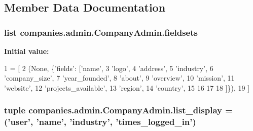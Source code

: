 \subsection{Member Data Documentation}
\hypertarget{classcompanies_1_1admin_1_1_company_admin_a2d93c6598f4c7641fe11eb1d94e67735}{
\subsubsection[{fieldsets}]{\setlength{\rightskip}{0pt plus 5cm}list companies.\-admin.\-Company\-Admin.\-fieldsets\hspace{0.3cm}{\ttfamily [static]}}}\label{classcompanies_1_1admin_1_1_company_admin_a2d93c6598f4c7641fe11eb1d94e67735}
{\bfseries Initial value\-:}
\begin{DoxyCode}
1 = [
2         (\textcolor{keywordtype}{None}, \{\textcolor{stringliteral}{'fields'}: [\textcolor{stringliteral}{'name'},
3                            \textcolor{stringliteral}{'logo'},
4                            \textcolor{stringliteral}{'address'},
5                            \textcolor{stringliteral}{'industry'},
6                            \textcolor{stringliteral}{'company\_size'},
7                            \textcolor{stringliteral}{'year\_founded'},
8                            \textcolor{stringliteral}{'about'},
9                            \textcolor{stringliteral}{'overview'},
10                            \textcolor{stringliteral}{'mission'},
11                            \textcolor{stringliteral}{'website'},
12                            \textcolor{stringliteral}{'projects\_available'},
13                            \textcolor{stringliteral}{'region'},
14                            \textcolor{stringliteral}{'country'},
15 
16 
17 
18         ]\}),
19     ]
\end{DoxyCode}
\hypertarget{classcompanies_1_1admin_1_1_company_admin_abb4744d6d299e31f3dd04cf568f99316}{
\subsubsection[{list\-\_\-display}]{\setlength{\rightskip}{0pt plus 5cm}tuple companies.\-admin.\-Company\-Admin.\-list\-\_\-display = ('user', 'name', 'industry', 'times\-\_\-logged\-\_\-in')\hspace{0.3cm}{\ttfamily [static]}}}\label{classcompanies_1_1admin_1_1_company_admin_abb4744d6d299e31f3dd04cf568f99316}
